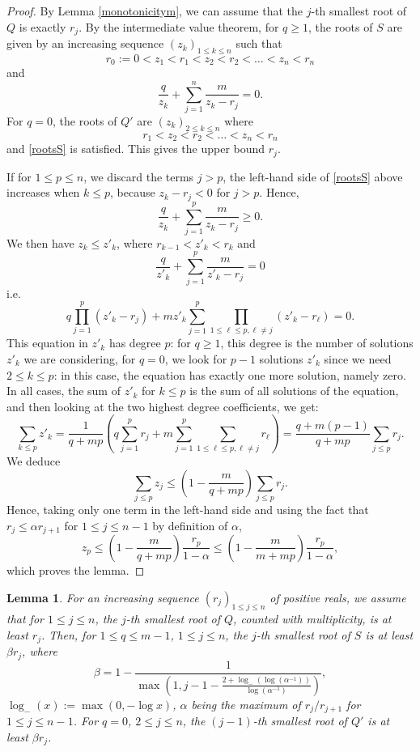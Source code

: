 \documentclass[11pt]{amsart}
\newtheorem{lemma}[theorem]{Lemma}
\begin{document}
\begin{proof}
By Lemma \ref{monotonicitym}, 
we can assume that the $j$-th smallest root of $Q$
is exactly $r_j$. 
By the intermediate value theorem, for $q \geq 1$, 
the roots of $S$ are given by an increasing
sequence $(z_k)_{1 \leq k \leq n}$
such that 
$$r_0 := 0 < z_1 < r_1 < z_2 < r_2 < \dots
< z_n < r_n$$
and 
\begin{equation} \frac{q}{z_k} + \sum_{j=1}^n \frac{m}{z_k - r_j} 
= 0. \label{rootsS}
\end{equation}
For $q = 0$, the roots of 
$Q'$ are $(z_k)_{2 \leq k \leq n}$
where 
$$ r_1 < z_2 < r_2 < \dots
< z_n < r_n$$
and \eqref{rootsS} is satisfied.  
This gives the upper bound $r_j$. 

If for $1 \leq p \leq n$, we discard the terms $j > p$, 
the left-hand side of \eqref{rootsS} above  
increases when $k \leq p$, because $z_k - r_j < 0 $ for $j > p$. Hence, 
$$\frac{q}{z_k} + \sum_{j = 1}^{p} \frac{m}{z_k - r_j}  \geq  0.$$
We then have $z_k \leq z'_k$, where 
$ r_{k-1} < z'_k < r_k$ and 
$$\frac{q}{z'_k} + \sum_{j = 1}^{p} \frac{m}{z'_k   - r_j}  =  0$$
 i.e. 
 $$q \prod_{j=1}^{p} (z'_k - r_j)
 + m z'_k \sum_{j=1}^{p} \prod_{1 \leq \ell  \leq p, \ell \neq j}  (z'_k  - r_\ell) = 0.$$
This equation in $z'_k$ has degree $p$:
for $q \geq 1$, this degree is the number of solutions $z'_k$ we are considering, for $q = 0$, we look for 
$p -1$ solutions $z'_k$ since we need $2 \leq k \leq p$: in this case, the equation has exactly one more solution, namely zero.  
In all cases, the sum of $z'_k$ for $k \leq p$ is the sum of all solutions of the equation, and then looking at the two highest degree coefficients, we get: 
$$\sum_{k \leq p} z'_k 
= \frac{1}{q + mp} \left( q \sum_{j=1}^p r_j 
+ m \sum_{j=1}^p \sum_{1 \leq \ell \leq p, \ell \neq j} r_{\ell}\right) = \frac{q + m(p-1)}{q + mp} 
\sum_{j \leq p} r_j.$$
We deduce 
$$ \sum_{j \leq p} z_j \leq \left(1 - \frac{m}{q + mp} \right) \sum_{j \leq p} r_j.$$
Hence, taking only one term in the left-hand side 
and using the fact that $r_j \leq \alpha r_{j+1}$ 
for $1 \leq j \leq n-1$
by definition of $\alpha$, 
$$z_p \leq 
\left(1 - \frac{m}{q + mp} \right) 
\frac{r_p}{1 - \alpha} 
\leq \left(1 - \frac{m}{m + mp} \right) 
\frac{r_p}{1 - \alpha},
$$
which proves the lemma. 
\end{proof}
\begin{lemma} \label{lowerbound}
For an increasing sequence $(r_j)_{1 \leq j \leq n}$ of positive reals, we assume that for $1 \leq j \leq n$, 
the $j$-th smallest root of $Q$, counted with multiplicity, is at least $r_j$. 
Then, for $1 \leq q \leq m-1$, $1 \leq j \leq n$, 
the $j$-th smallest root of $S$ is 
at least $ \beta r_j$, where 
$$\beta =  1 - \frac{1}{ \max \left(1,  j-1 - \frac{2 + \log_- (\log (\alpha^{-1}) )}{\log (\alpha^{-1})}   \right)}, $$
$\log_-(x):=\max(0,-\log x)$, $\alpha$ being the maximum of $r_j/r_{j+1}$
for $1 \leq j \leq n-1$. For $q = 0$, 
$2 \leq j \leq n$, 
the $(j-1)$-th smallest root of $Q'$ is 
at least $ \beta r_j$. 
\end{lemma}
\end{document}

